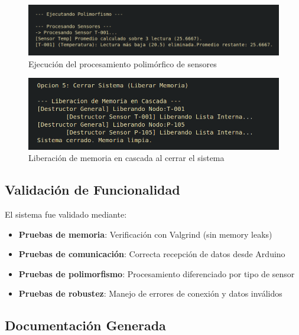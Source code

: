 \documentclass[conference]{IEEEtran}
\begin{document}
\begin{figure}[h]
    \centering
    \includegraphics[width=\RelacionFiguradoscolumnas\columnwidth]{procesamiento_polimorfico.png}
    \caption{Ejecución del procesamiento polimórfico de sensores}
    \label{fig:procesamiento}
\end{figure}

\begin{figure}[h]
    \centering
    \includegraphics[width=\RelacionFiguradoscolumnas\columnwidth]{liberacion_memoria.png}
    \caption{Liberación de memoria en cascada al cerrar el sistema}
    \label{fig:destruccion}
\end{figure}

\subsection{Validación de Funcionalidad}

El sistema fue validado mediante:

\begin{itemize}
    \item \textbf{Pruebas de memoria}: Verificación con Valgrind (sin memory leaks)
    \item \textbf{Pruebas de comunicación}: Correcta recepción de datos desde Arduino
    \item \textbf{Pruebas de polimorfismo}: Procesamiento diferenciado por tipo de sensor
    \item \textbf{Pruebas de robustez}: Manejo de errores de conexión y datos inválidos
\end{itemize}

\subsection{Documentación Generada}
\end{document}
